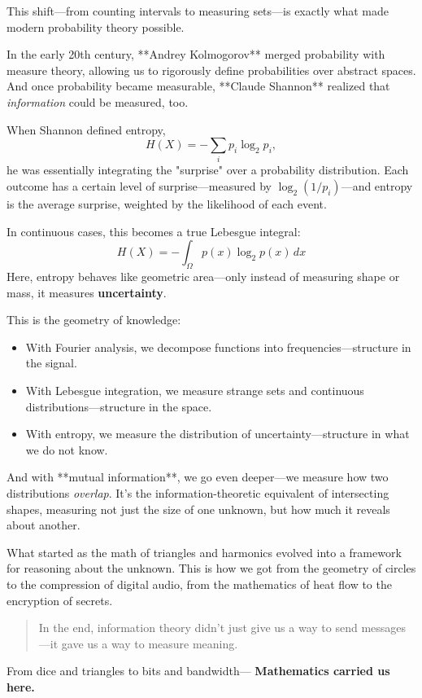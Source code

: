 This shift—from counting intervals to measuring sets—is exactly what made modern probability theory possible.

In the early 20th century, **Andrey Kolmogorov** merged probability with measure theory, allowing us to rigorously define probabilities over abstract spaces. And once probability became measurable, **Claude Shannon** realized that \emph{information} could be measured, too.

When Shannon defined entropy,
\[
H(X) = -\sum_i p_i \log_2 p_i,
\]
he was essentially integrating the "surprise" over a probability distribution. Each outcome has a certain level of surprise—measured by \( \log_2(1/p_i) \)—and entropy is the average surprise, weighted by the likelihood of each event.

In continuous cases, this becomes a true Lebesgue integral:
\[
H(X) = -\int_\Omega p(x) \log_2 p(x) \, dx
\]
Here, entropy behaves like geometric area—only instead of measuring shape or mass, it measures \textbf{uncertainty}.

This is the geometry of knowledge: 
\begin{itemize}
  \item With Fourier analysis, we decompose functions into frequencies—structure in the signal.
  \item With Lebesgue integration, we measure strange sets and continuous distributions—structure in the space.
  \item With entropy, we measure the distribution of uncertainty—structure in what we do not know.
\end{itemize}

And with **mutual information**, we go even deeper—we measure how two distributions \emph{overlap}. It’s the information-theoretic equivalent of intersecting shapes, measuring not just the size of one unknown, but how much it reveals about another.

What started as the math of triangles and harmonics evolved into a framework for reasoning about the unknown. This is how we got from the geometry of circles to the compression of digital audio, from the mathematics of heat flow to the encryption of secrets.

\begin{quote}
In the end, information theory didn’t just give us a way to send messages—it gave us a way to measure meaning.
\end{quote}

From dice and triangles to bits and bandwidth—  
\textbf{Mathematics carried us here.}

















